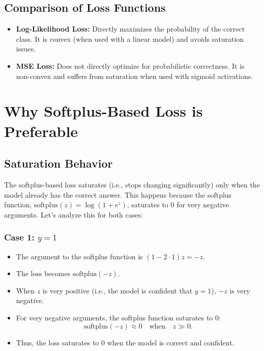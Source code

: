 \begin{notechapter}
\subsection{Comparison of Loss Functions}
\begin{itemize}
    \item \textbf{Log-Likelihood Loss:} Directly maximizes the probability of the correct class. It is convex (when used with a linear model) and avoids saturation issues.
    \item \textbf{MSE Loss:} Does not directly optimize for probabilistic correctness. It is non-convex and suffers from saturation when used with sigmoid activations.
\end{itemize}

\section{Why Softplus-Based Loss is Preferable}

\subsection{Saturation Behavior}
The softplus-based loss saturates (i.e., stops changing significantly) only when the model already has the correct answer. This happens because the softplus function, \( \text{softplus}(z) = \log(1 + e^z) \), saturates to 0 for very negative arguments. Let’s analyze this for both cases:

\subsubsection{Case 1: \( y = 1 \)}
\begin{itemize}
    \item The argument to the softplus function is \( (1 - 2 \cdot 1)z = -z \).
    \item The loss becomes \( \text{softplus}(-z) \).
    \item When \( z \) is very positive (i.e., the model is confident that \( y = 1 \)), \( -z \) is very negative.
    \item For very negative arguments, the softplus function saturates to 0:
          \[
          \text{softplus}(-z) \approx 0 \quad \text{when} \quad z \gg 0.
          \]
    \item Thus, the loss saturates to 0 when the model is correct and confident.
\end{itemize}


\end{notechapter}

